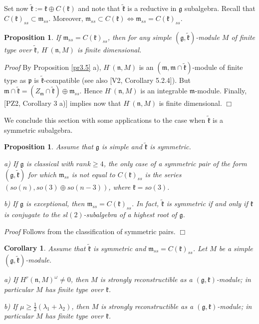 \documentclass[11pt]{amsart}
\newcounter{theorem}
\newtheorem{corollary}[theo]{Corollary}
\newtheorem{prop}[theo]{Proposition}
\renewenvironment{proof}{ \emph{Proof}}{$\Box$}
\newcommand{\kk}{\mathfrak{k}}
\newcommand{\nn}{\mathfrak{n}}
\newcommand{\mm}{\mathfrak{m}}
\newcommand{\pp}{\mathfrak{p}}
\renewcommand{\gg}{\mathfrak{g}}
\newcommand{\refprop}[1]{Proposition \ref{#1}}
\begin{document}
Set now $\tilde{\kk}:=\kk\oplus C(\kk)$ and note that $\tilde{\kk}$ is a reductive in $\gg$ subalgebra. Recall that $C(\kk)_{ss}\subset \mm_{ss}$. Moreover, $\mm_{ss}\subset C(\kk)\Leftrightarrow \mm_{ss}=C(\kk)_{ss}$.
\begin{prop}
If $\mm_{ss}=C(\kk)_{ss}$, then for any simple $(\gg,\tilde{\kk})$-module $M$ of finite type over $\tilde{\kk}$, $H^\cdot(\nn,M)$ is finite dimensional.
\end{prop}
\begin{proof}
By \refprop{pr3.5} a), $H^\cdot(\nn,M)$ is an $(\mm,\mm\cap\tilde{\kk})$-module of finite type as $\pp$ is $\tilde{\kk}$-compatible (see also [V2, Corollary 5.2.4]). But $\mm\cap\tilde{\kk}=(Z_\mm\cap\tilde{\kk})\oplus\mm_{ss}$. Hence $H^\cdot(\nn,M)$ is an integrable $\mm$-module. Finally, [PZ2, Corollary 3 a)] implies now that $H^\cdot(\nn,M)$ is finite dimensional.
\end{proof}

We conclude this section with some applications to the case when $\tilde{\kk}$ is a symmetric subalgebra.
\begin{prop}\label{pr6.8}
Assume that $\gg$ is simple and $\tilde{\kk}$ is symmetric.

a) If $\gg$ is classical with $rank\geq 4$, the only case of a symmetric pair of the form $(\gg,\tilde{\kk})$ for which $\mm_{ss}$ is not equal to $C(\kk)_{ss}$ is the series $(so(n), so(3)\oplus so(n-3))$, where $\kk=so(3)$.

b) If $\gg$ is exceptional, then $\mm_{ss}=C(\kk)_{ss}$. In fact, $\tilde{\kk}$ is symmetric if and only if $\kk$ is conjugate to the $sl(2)$-subalgebra of a highest root of $\gg$.
\end{prop}
\begin{proof}
Follows from the classification of symmetric pairs.
\end{proof}

\begin{corollary}
Assume that $\tilde{\kk}$ is symmetric and $\mm_{ss}=C(\kk)_{ss}$. Let $M$ be a simple $(\gg,\tilde{\kk})$-module.

a) If $H^r(\nn,M)^{\omega}\neq 0$, then $M$ is strongly reconstructible as a $(\gg,\kk)$-module; in particular $M$ has finite type over $\kk$.

b) If $\mu\geq\frac{1}{2}(\lambda_1+\lambda_2)$, then $M$ is strongly reconstructible as a $(\gg,\kk)$-module; in particular $M$ has finite type over $\kk$.
\end{corollary}
 
\end{document}
